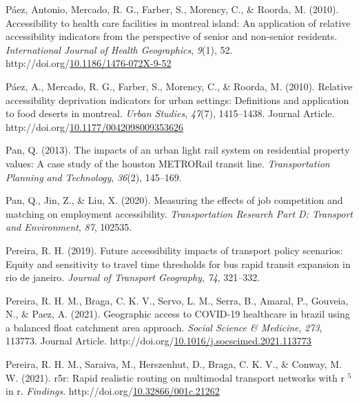 \documentclass[
11pt, %
oneside, %
english, %
singlespacing, %
]{macthesis} %
\newlength{\cslhangindent}
\newenvironment{CSLReferences}[2] %
{\begin{list}{}{%
	\setlength{\itemindent}{0pt}
	\setlength{\leftmargin}{0pt}
	\setlength{\parsep}{0pt}
	\ifodd #1
	\setlength{\leftmargin}{\cslhangindent}
	\setlength{\itemindent}{-1\cslhangindent}
	\fi
	\setlength{\itemsep}{#2\baselineskip}}}
{\end{list}}
\begin{document}
\begin{CSLReferences}{1}{0}
Páez, Antonio, Mercado, R. G., Farber, S., Morency, C., \& Roorda, M. (2010). Accessibility to health care facilities in montreal island: An application of relative accessibility indicators from the perspective of senior and non-senior residents. \emph{International Journal of Health Geographics}, \emph{9}(1), 52. http://doi.org/\href{https://doi.org/10.1186/1476-072X-9-52}{10.1186/1476-072X-9-52}

Páez, A., Mercado, R. G., Farber, S., Morency, C., \& Roorda, M. (2010). Relative accessibility deprivation indicators for urban settings: Definitions and application to food deserts in montreal. \emph{Urban Studies}, \emph{47}(7), 1415--1438. Journal Article. http://doi.org/\href{https://doi.org/10.1177/0042098009353626}{10.1177/0042098009353626}

Pan, Q. (2013). The impacts of an urban light rail system on residential property values: A case study of the houston METRORail transit line. \emph{Transportation Planning and Technology}, \emph{36}(2), 145--169.

Pan, Q., Jin, Z., \& Liu, X. (2020). Measuring the effects of job competition and matching on employment accessibility. \emph{Transportation Research Part D: Transport and Environment}, \emph{87}, 102535.

Pereira, R. H. (2019). Future accessibility impacts of transport policy scenarios: Equity and sensitivity to travel time thresholds for bus rapid transit expansion in rio de janeiro. \emph{Journal of Transport Geography}, \emph{74}, 321--332.

Pereira, R. H. M., Braga, C. K. V., Servo, L. M., Serra, B., Amaral, P., Gouveia, N., \& Paez, A. (2021). Geographic access to COVID-19 healthcare in brazil using a balanced float catchment area approach. \emph{Social Science \& Medicine}, \emph{273}, 113773. Journal Article. http://doi.org/\href{https://doi.org/10.1016/j.socscimed.2021.113773}{10.1016/j.socscimed.2021.113773}

Pereira, R. H. M., Saraiva, M., Herszenhut, D., Braga, C. K. V., \& Conway, M. W. (2021). r5r: Rapid realistic routing on multimodal transport networks with r \(^{\textrm{5}}\) in r. \emph{Findings}. http://doi.org/\href{https://doi.org/10.32866/001c.21262}{10.32866/001c.21262}


\end{CSLReferences}
\end{document}

